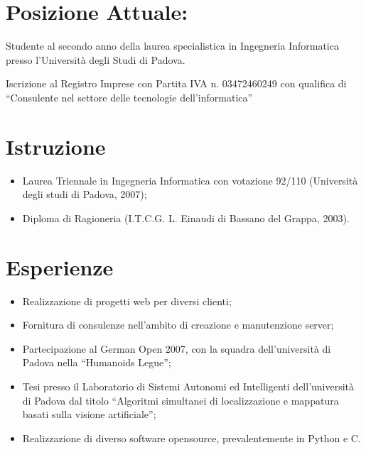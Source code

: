 \documentclass[pdftex, a4paper, 11pt]{article}
\begin{document}
\section*{Posizione Attuale:}

\hspace{0.58cm}Studente al secondo anno della laurea specialistica in Ingegneria
Informatica presso l'Universit\`a degli Studi di Padova. 

Iscrizione al Registro Imprese con Partita IVA
n. 03472460249 con qualifica di ``Consulente nel settore delle
tecnologie dell'informatica''


\section*{Istruzione}
\begin{itemize}
\item Laurea Triennale in Ingegneria Informatica con votazione 92/110 (Universit\`a degli
  studi di Padova, 2007);
\item Diploma di Ragioneria (I.T.C.G. L. Einaudi di Bassano del Grappa,
  2003).
\end{itemize}

\section*{Esperienze}
\begin{itemize}
\item Realizzazione di progetti web per diversi clienti;
\item Fornitura di consulenze nell'ambito di creazione e manutenzione server;
\item Partecipazione al German Open 2007, con la squadra
  dell'universit\`a di Padova nella ``Humanoids Legue'';
\item Tesi presso il Laboratorio di Sistemi Autonomi ed
  Intelligenti dell'universit\`a di Padova dal titolo ``Algoritmi
  simultanei di localizzazione e mappatura basati sulla visione artificiale'';
\item Realizzazione di diverso software opensource,
  prevalentemente in Python e C.
\end{itemize}
\end{document}
